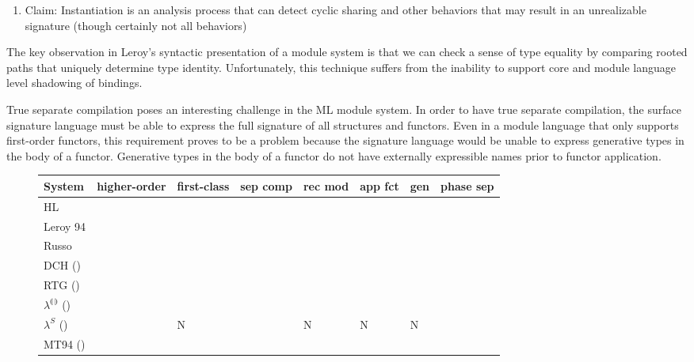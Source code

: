\documentclass[9pt]{sigplanconf}
\begin{document}
{\begin{enumerate}
	\begin{enumerate}
		\item Interaction with Hindley-Milner polymorphism in core language
		\item Moscow ML's first-class modules provides first-class polymorphism
		\item Example: polymorphic data structures, continuation monad \cite{kahrs94}
	\end{enumerate}
	\item Claim: Instantiation is an analysis process that can detect cyclic sharing and other behaviors that may result in an unrealizable signature (though certainly not all behaviors)
\end{enumerate}	

The key observation in Leroy's syntactic presentation of a module system is that we can check a sense of type equality by comparing rooted paths that uniquely determine type identity. Unfortunately, this technique suffers from the inability to support core and module language level shadowing of bindings. 
 
True separate compilation poses an interesting challenge in the ML module system. In order to have true separate compilation, the surface signature language must be able to express the full signature of all structures and functors. Even in a module language that only supports first-order functors, this requirement proves to be a problem because the signature language would be unable to express generative types in the body of a functor. Generative types in the body of a functor do not have externally expressible names prior to functor application. 

\begin{figure}
	\tiny
\begin{tabular}{|l|l|l|l|l|l|l|l|}
	\hline
System & higher-order & first-class & sep comp & rec mod & app fct & gen & phase sep\\
	\hline
	HL \cite{lillibridge94} & & \checkmark & & & & \\
	\hline
	Leroy 94 & & & & & & \\
	\hline
	Russo \cite{russo01} & & \checkmark & & \checkmark & & \\
	\hline
	DCH (\cite{dhc03}) & & & & & & \\
	\hline
	RTG (\cite{dreyer05}) & & & & & & \\
	\hline
	$\lambda^{\llparenthesis~\rrparenthesis}$ (\cite{ATTAPL}) & & & & & & \\
	\hline
	$\lambda^S$ (\cite{ATTAPL}) & & N & & N & N & N \\
	\hline
	MT94 (\cite{mt94}) & \checkmark & & & & & \checkmark & \checkmark \\
	\hline
\end{tabular}
\end{figure}

}
\end{document}
